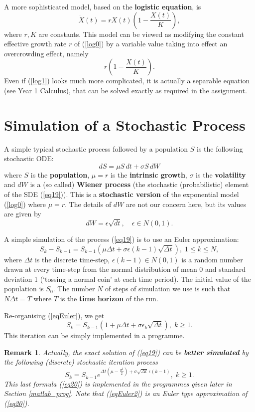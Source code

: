 \documentclass[12pt]{article}
\def\Dd{\Delta}
\def\eps{\epsilon}
\newcommand{\be}{\begin{equation}}
\newcommand{\ee}{\end{equation}}
\newtheorem{remark}[theorem]{Remark}
\begin{document}
A more sophisticated model, based on the {\bf\red logistic equation}, is
\be\label{log1} \dot{X}(t)=rX(t)\left(1-\frac{X(t)}{K}\right)\!, \ee
where $r,K$ are constants. This model can be viewed as modifying the constant effective growth rate $r$
of (\ref{log0}) by a variable value taking into effect an overcrowding effect, namely
$$ r\left(1-\frac{X(t)}{K}\right)\!. $$
Even if (\ref{log1}) looks much more complicated, it is actually a separable equation
(see Year 1 Calculus), that can be solved exactly as required in the assignment.

\section{Simulation of a Stochastic Process}\label{simulation}

A simple typical stochastic process followed by a population $S$ is the following stochastic ODE:
\be\label{eq19} dS=\mu S\,dt+\sigma S\,dW \ee
where $S$ is the {\bf\red population}, $\mu=r$ is the {\bf\red intrinsic growth},
$\sigma$ is the {\bf\red volatility} and $dW$ is a (so called) {\bf\red Wiener process}
(the stochastic (probabilistic) element of the SDE (\ref{eq19})).
This is a {\bf\magenta stochastic version} of the exponential model (\ref{log0}) where $\mu=r$.
The details of $dW$ are not our concern here, but its values are given by
\be\label{eq-Wiener} dW=\eps\sqrt{dt},\quad \eps\in N(0,1). \ee

A simple simulation of the process (\ref{eq19}) is to use an Euler approximation:
\be\label{eqEuler} S_k-S_{k-1}=S_{k-1}\left(\mu\Dd t+\sigma\eps(k-1)\sqrt{\Dd t}\right)\!,\;
1\leq k\leq N, \ee
where $\Dd t$ is the discrete time-step, $\eps(k-1)\in N(0,1)$ is a random number drawn
at every time-step from the normal distribution of mean 0 and standard deviation 1
(`tossing a normal coin' at each time period). The initial value of the population is $S_0$.
The number $N$ of steps of simulation we use is such that $N\Dd t=T$
where $T$ is the {\bf\red time horizon} of the run.

\newpage

Re-organising (\ref{eqEuler}), we get
\be\label{eqEuler2} S_k=S_{k-1}\left(1+\mu\Dd t+\sigma\eps_k\sqrt{\Dd t}\right)\!,\;k\geq 1. \ee
This iteration can be simply implemented in a programme.

\begin{remark} Actually, the exact solution of (\ref{eq19}) can be {\magenta\bf better simulated} by the following (discrete) stochastic iteration process
\be\label{eq20} S_k=
S_{k-1}e^{\Dd t(\mu-\frac{\sigma^2}{2})+\sigma\sqrt{\Dd t}\,\eps(k-1)},\;k\geq 1. \ee
This last formula (\ref{eq20}) is implemented in the programmes given later
in Section \ref{matlab_prog}.
Note that (\ref{eqEuler2}) is an Euler type approximation of (\ref{eq20}). \end{remark}
\end{document}
